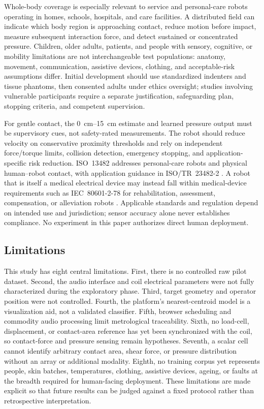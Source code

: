\documentclass[10pt]{article}
\begin{document}
Whole-body coverage is especially relevant to service and personal-care robots operating in homes, schools, hospitals, and care facilities. A distributed field can indicate which body region is approaching contact, reduce motion before impact, measure subsequent interaction force, and detect sustained or concentrated pressure. Children, older adults, patients, and people with sensory, cognitive, or mobility limitations are not interchangeable test populations: anatomy, movement, communication, assistive devices, clothing, and acceptable-risk assumptions differ. Initial development should use standardized indenters and tissue phantoms, then consented adults under ethics oversight; studies involving vulnerable participants require a separate justification, safeguarding plan, stopping criteria, and competent supervision.

For gentle contact, the \SIrange{0}{15}{\centi\metre} estimate and learned pressure output must be supervisory cues, not safety-rated measurements. The robot should reduce velocity on conservative proximity thresholds and rely on independent force/torque limits, collision detection, emergency stopping, and application-specific risk reduction. ISO~13482 addresses personal-care robots and physical human--robot contact, with application guidance in ISO/TR~23482-2 \citep{iso13482,isotr23482}. A robot that is itself a medical electrical device may instead fall within medical-device requirements such as IEC~80601-2-78 for rehabilitation, assessment, compensation, or alleviation robots \citep{iec80601}. Applicable standards and regulation depend on intended use and jurisdiction; sensor accuracy alone never establishes compliance. No experiment in this paper authorizes direct human deployment.

\subsection{Limitations}
This study has eight central limitations. First, there is no controlled raw pilot dataset. Second, the audio interface and coil electrical parameters were not fully characterized during the exploratory phase. Third, target geometry and operator position were not controlled. Fourth, the platform's nearest-centroid model is a visualization aid, not a validated classifier. Fifth, browser scheduling and commodity audio processing limit metrological traceability. Sixth, no load-cell, displacement, or contact-area reference has yet been synchronized with the coil, so contact-force and pressure sensing remain hypotheses. Seventh, a scalar cell cannot identify arbitrary contact area, shear force, or pressure distribution without an array or additional modality. Eighth, no training corpus yet represents people, skin batches, temperatures, clothing, assistive devices, ageing, or faults at the breadth required for human-facing deployment. These limitations are made explicit so that future results can be judged against a fixed protocol rather than retrospective interpretation.
\end{document}
